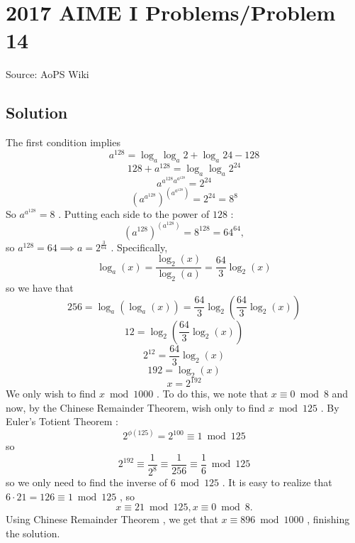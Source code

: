 \documentclass[12pt]{article}
\begin{document}
\section*{{2017 AIME I Problems/Problem 14}}
Source: AoPS Wiki

\subsection*{Solution}
The first condition implies \[a^{128} = \log_a\log_a 2 + \log_a 24 - 128\] \[128+a^{128} = \log_a\log_a 2^{24}\] \[a^{a^{128}a^{a^{128}}} = 2^{24}\] \[\left(a^{a^{128}}\right)^{\left(a^{a^{128}}\right)} = 2^{24} = 8^8\] So $a^{a^{128}} = 8$ . Putting each side to the power of $128$ : \[\left(a^{128}\right)^{\left(a^{128}\right)} = 8^{128} = 64^{64},\] so $a^{128} = 64 \implies a = 2^{\frac{3}{64}}$ . Specifically, \[\log_a(x) = \frac{\log_2(x)}{\log_2(a)} = \frac{64}{3}\log_2(x)\] so we have that \[256 = \log_a(\log_a(x)) = \frac{64}{3}\log_2\left(\frac{64}{3}\log_2(x)\right)\] \[12 = \log_2\left(\frac{64}{3}\log_2(x)\right)\] \[2^{12} = \frac{64}{3}\log_2(x)\] \[192 = \log_2(x)\] \[x = 2^{192}\] We only wish to find $x\bmod 1000$ . To do this, we note that $x\equiv 0\bmod 8$ and now, by the Chinese Remainder Theorem, wish only to find $x\bmod 125$ . By Euler's Totient Theorem : \[2^{\phi(125)} = 2^{100} \equiv 1\bmod 125\] so \[2^{192} \equiv \frac{1}{2^8} \equiv \frac{1}{256} \equiv \frac{1}{6} \bmod 125\] so we only need to find the inverse of $6 \bmod 125$ . It is easy to realize that $6\cdot 21 = 126 \equiv 1\bmod 125$ , so \[x\equiv 21\bmod 125, x\equiv 0\bmod 8.\] Using Chinese Remainder Theorem , we get that $x\equiv \boxed{896}\bmod 1000$ , finishing the solution.
\end{document}
